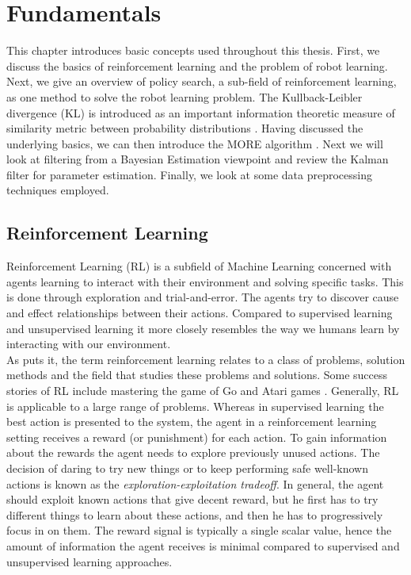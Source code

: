 
\chapter{Fundamentals}
This chapter introduces basic concepts used throughout this thesis.
First, we discuss the basics of reinforcement learning and
the problem of robot learning.
Next, we give an overview of policy search,
a sub-field of reinforcement learning,
as one method to solve the robot learning problem.
The Kullback-Leibler divergence (KL) is
introduced as an important information theoretic
measure of similarity metric between probability
distributions \citep{kullback1951information}.
Having discussed the underlying basics, we can then
introduce the MORE algorithm \citep{abdolmaleki2015model}.
Next we will look at filtering from a Bayesian Estimation viewpoint and
review the Kalman filter for parameter estimation. Finally, we
look at some data preprocessing techniques employed.

\section{Reinforcement Learning}
Reinforcement Learning (RL) is a subfield of Machine Learning
concerned with agents
learning to interact with their environment and
solving specific tasks.
This is done through exploration and trial-and-error. The agents
try to discover cause and effect relationships between their actions.
Compared to supervised learning and unsupervised learning it
more closely resembles the way we humans learn by interacting
with our environment. \\
As \citet{sutton2018reinforcement} puts it,
the term reinforcement learning relates to a class of problems,
solution methods and the field that studies these problems and solutions.
Some success stories of RL include mastering the game of Go
\citep{silver2016mastering} and Atari games \citep{mnih2013playing}.
Generally, RL is applicable to a large range of problems.
Whereas in supervised learning the best action is presented to the system,
the agent in a reinforcement learning setting receives a
reward (or punishment) for each action.
To gain information about the rewards the agent needs
to explore previously unused actions.
The decision of daring to try new things or to keep performing safe
well-known actions is known as the
\textit{exploration-exploitation tradeoff}.
In general, the agent should exploit known actions that
give decent reward, but he first
has to try different things to learn about these actions,
and then he has to progressively focus in on them.
The reward signal is typically a single scalar value,
hence the amount of information
the agent receives is minimal compared to
supervised and unsupervised learning approaches.

